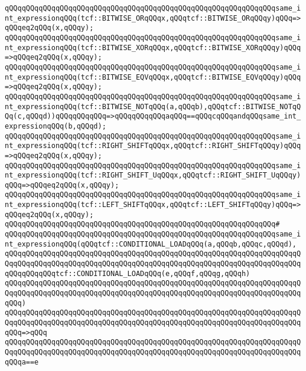 \verb|qQQqqQQqqQQqqQQqqQQqqQQqqQQqqQQqqQQqqQQqqQQqqQQqqQQqqQQqqQQqqQQqsame_int_expressionqQQq(tcf::BITWISE_ORqQQqx,qQQqtcf::BITWISE_ORqQQqy)qQQq=>qQQqeq2qQQq(x,qQQqy);|\newline
\verb|qQQqqQQqqQQqqQQqqQQqqQQqqQQqqQQqqQQqqQQqqQQqqQQqqQQqqQQqqQQqqQQqsame_int_expressionqQQq(tcf::BITWISE_XORqQQqx,qQQqtcf::BITWISE_XORqQQqy)qQQq=>qQQqeq2qQQq(x,qQQqy);|\newline
\verb|qQQqqQQqqQQqqQQqqQQqqQQqqQQqqQQqqQQqqQQqqQQqqQQqqQQqqQQqqQQqqQQqsame_int_expressionqQQq(tcf::BITWISE_EQVqQQqx,qQQqtcf::BITWISE_EQVqQQqy)qQQq=>qQQqeq2qQQq(x,qQQqy);|\newline
\verb|qQQqqQQqqQQqqQQqqQQqqQQqqQQqqQQqqQQqqQQqqQQqqQQqqQQqqQQqqQQqqQQqsame_int_expressionqQQq(tcf::BITWISE_NOTqQQq(a,qQQqb),qQQqtcf::BITWISE_NOTqQQq(c,qQQqd))qQQqqQQqqQQq=>qQQqqQQqqQQqaqQQq==qQQqcqQQqandqQQqsame_int_expressionqQQq(b,qQQqd);|\newline
\verb|qQQqqQQqqQQqqQQqqQQqqQQqqQQqqQQqqQQqqQQqqQQqqQQqqQQqqQQqqQQqqQQqsame_int_expressionqQQq(tcf::RIGHT_SHIFTqQQqx,qQQqtcf::RIGHT_SHIFTqQQqy)qQQq=>qQQqeq2qQQq(x,qQQqy);|\newline
\verb|qQQqqQQqqQQqqQQqqQQqqQQqqQQqqQQqqQQqqQQqqQQqqQQqqQQqqQQqqQQqqQQqsame_int_expressionqQQq(tcf::RIGHT_SHIFT_UqQQqx,qQQqtcf::RIGHT_SHIFT_UqQQqy)qQQq=>qQQqeq2qQQq(x,qQQqy);|\newline
\verb|qQQqqQQqqQQqqQQqqQQqqQQqqQQqqQQqqQQqqQQqqQQqqQQqqQQqqQQqqQQqqQQqsame_int_expressionqQQq(tcf::LEFT_SHIFTqQQqx,qQQqtcf::LEFT_SHIFTqQQqy)qQQq=>qQQqeq2qQQq(x,qQQqy);|\newline
\verb|qQQqqQQqqQQqqQQqqQQqqQQqqQQqqQQqqQQqqQQqqQQqqQQqqQQqqQQqqQQqqQQq#|\newline
\verb|qQQqqQQqqQQqqQQqqQQqqQQqqQQqqQQqqQQqqQQqqQQqqQQqqQQqqQQqqQQqqQQqsame_int_expressionqQQq(qQQqtcf::CONDITIONAL_LOADqQQq(a,qQQqb,qQQqc,qQQqd),|\newline
\verb|qQQqqQQqqQQqqQQqqQQqqQQqqQQqqQQqqQQqqQQqqQQqqQQqqQQqqQQqqQQqqQQqqQQqqQQqqQQqqQQqqQQqqQQqqQQqqQQqqQQqqQQqqQQqqQQqqQQqqQQqqQQqqQQqqQQqqQQqqQQqqQQqqQQqqQQqtcf::CONDITIONAL_LOADqQQq(e,qQQqf,qQQqg,qQQqh)|\newline
\verb|qQQqqQQqqQQqqQQqqQQqqQQqqQQqqQQqqQQqqQQqqQQqqQQqqQQqqQQqqQQqqQQqqQQqqQQqqQQqqQQqqQQqqQQqqQQqqQQqqQQqqQQqqQQqqQQqqQQqqQQqqQQqqQQqqQQqqQQqqQQqqQQq)|\newline
\verb|qQQqqQQqqQQqqQQqqQQqqQQqqQQqqQQqqQQqqQQqqQQqqQQqqQQqqQQqqQQqqQQqqQQqqQQqqQQqqQQqqQQqqQQqqQQqqQQqqQQqqQQqqQQqqQQqqQQqqQQqqQQqqQQqqQQqqQQqqQQqqQQq=>qQQq|\newline
\verb|qQQqqQQqqQQqqQQqqQQqqQQqqQQqqQQqqQQqqQQqqQQqqQQqqQQqqQQqqQQqqQQqqQQqqQQqqQQqqQQqqQQqqQQqqQQqqQQqqQQqqQQqqQQqqQQqqQQqqQQqqQQqqQQqqQQqqQQqqQQqqQQqa==e|\newline

